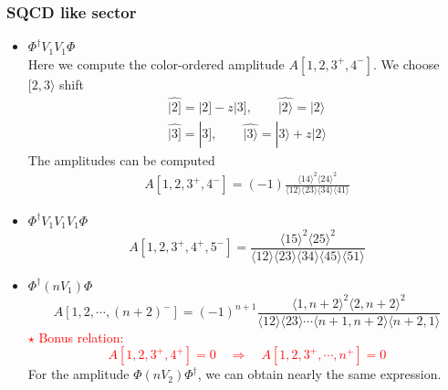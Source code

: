 \documentclass{beamer}
\newcommand{\aket}[1]{|#1\rangle}
\newcommand{\sket}[1]{|#1]}
\newcommand{\avg}[1]{\langle #1 \rangle}
\newcommand{\mdavg}[2]{\langle #1 \rangle\!\langle #2 \rangle}
\begin{document}
\begin{frame}
    \frametitle{SQCD like sector}
    \begin{itemize}
        \item $\Phi^\dagger V_1V_1\Phi$\\
        Here we compute the color-ordered amplitude $A[1,2,3^+,4^-]$. We choose $[2,3\rangle$ shift
        \begin{gather*}
        \hat{\sket{2}}=\sket{2}-z\sket{3},\qquad \hat{\aket{2}}=\aket{2} \\
        \hat{\sket{3}}=\sket{3},\qquad \hat{\aket{3}}=\aket{3}+z\aket{2}
        \end{gather*}
        The amplitudes can be computed 
        \begin{align*}
            A[1,2,3^+,4^-]=(-1)\frac{\avg{14}^2\avg{24}^2}{\mdavg{12}{23}\!\mdavg{34}{41}}
        \end{align*}
        \item $\Phi^\dagger V_1V_1V_1\Phi$
            \begin{equation*}
                A[1,2,3^+,4^+,5^-]=\frac{\avg{15}^2\!\avg{25}^2}{\mdavg{12}{23}\!\mdavg{34}{45}\!\avg{51}}
            \end{equation*}
    \end{itemize}
\end{frame}

\begin{frame}
    \begin{itemize}
        \item $\Phi^\dagger (nV_1)\Phi$
            \begin{equation*}
                A[1,2,\cdots,(n+2)^-]=(-1)^{n+1}\frac{\avg{1,n+2}^2\avg{2,n+2}^2}{\mdavg{12}{23}\cdots\mdavg{n+1,n+2}{n+2,1}}
            \end{equation*}
            \textcolor{red}{$\star$ Bonus relation: \begin{equation*}
                A[1,2,3^+,4^+]=0\quad \Rightarrow  \quad A[1,2,3^+,\cdots,n^+]=0 \end{equation*}}
        For the amplitude $\Phi (nV_2)\Phi^\dagger$, we can obtain nearly the same expression.
    \end{itemize}
\end{frame}
\end{document}
